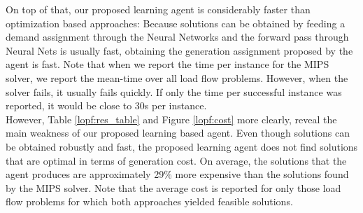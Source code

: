 On top of that, our proposed learning agent is considerably faster than optimization based approaches: Because solutions can be obtained by feeding a demand assignment through the Neural Networks and the forward pass through Neural Nets is usually fast, obtaining the generation assignment proposed by the agent is fast. Note that when we report the time per instance for the MIPS solver, we report the mean-time over all load flow problems. However, when the solver fails, it usually fails quickly. If only the time per successful instance was reported, it would be close to 30s per instance.\\
However, Table \ref{lopf:res_table} and Figure \ref{lopf:cost} more clearly, reveal the main weakness of our proposed learning based agent. Even though solutions can be obtained robustly and fast, the proposed learning agent does not find solutions that are optimal in terms of generation cost. On average, the solutions that the agent produces are approximately 29\% more expensive than the solutions found by the MIPS solver. Note that the average cost is reported for only those load flow problems for which both approaches yielded feasible solutions.


